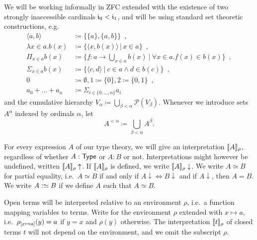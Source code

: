 \documentclass{schwicht}
\begin{document}
We will be working informally in ZFC extended with the existence of two
strongly inaccessible cardinals $\mathfrak{i}_0 < \mathfrak{i}_1$,
and will be using standard set theoretic constructions, e.g.
{\allowdisplaybreaks %
\begin{align*}
\langle a, b\rangle &\coloneqq \{ \{ a \}, \{ a, b \}\} \enspace , \\
\lambda x \in a.b(x) &\coloneqq \{\langle x, b(x)\rangle\,|\,x \in a \} \enspace ,\\
\Pi_{x \in a}b(x) &\coloneqq \{ f : a \to \bigcup_{x \in a}b(x)\ |\ \forall x \in a.f(x) \in b(x)\} \enspace , \\
\Sigma_{x \in a}b(x) &\coloneqq \{ \langle c , d\rangle\ |\ c \in a \land d
\in b(c) \} \enspace , \\
0 &\coloneqq \emptyset, 1 \coloneqq \{0\}, 2 \coloneqq \{0, 1\} \enspace , \\
a_0 + \ldots + a_n &\coloneqq \Sigma_{i \in \{0, \ldots, n\}}a_i
\end{align*}
%
and the cumulative hierarchy $V_{\alpha} \coloneqq
\displaystyle\bigcup_{\beta < \alpha} \mathcal{P}(V_{\beta})$. Whenever we
introduce sets $A^{\alpha}$ indexed by ordinals $\alpha$, let \[A^{< \alpha}
\coloneqq \displaystyle\bigcup_{\beta < \alpha}A^{\beta}.\]
}

For every expression $A$ of our type theory, we will give an interpretation
$\llbracket A \rrbracket_\rho$, regardless of whether $A : \mathsf{Type}$ or $A : B$ or not. Interpretations
might however be undefined, written $\llbracket A \rrbracket_\rho\uparrow$. If $\llbracket A \rrbracket_\rho$
is defined, we write $\llbracket A \rrbracket_\rho\downarrow$. We write $A \simeq B$ for
partial equality, i.e.\ $A \simeq B$ if and only if $A\downarrow
\Leftrightarrow B\downarrow$ and if $A\downarrow$, then $A = B$. We write $A
\mathrel{\mathop:}\simeq B$ if we define $A$ such that $A \simeq B$.

Open terms will be interpreted relative to an environment $\rho$, i.e.\ a
function mapping variables to terms. Write  for the
environment $\rho$ extended with $x \mapsto a$, i.e.\ $\rho_{[x \mapsto a]}(y) = a$
if $y = x$ and $\rho(y)$ otherwise. The interpretation $\llbracket t \rrbracket_{\rho}$ of closed
terms $t$ will not depend on the environment, and we omit the subscript $\rho$.
\end{document}
